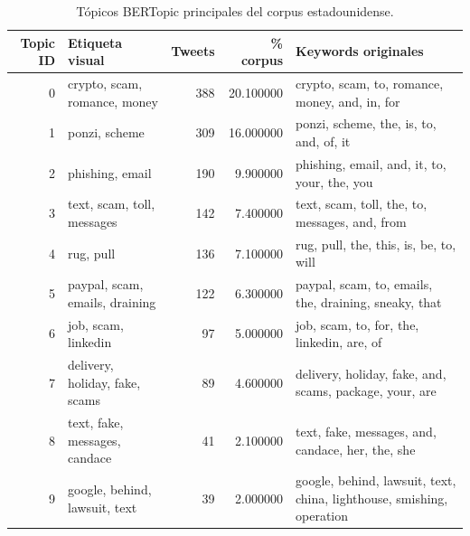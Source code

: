 \begin{table}
\caption{Tópicos BERTopic principales del corpus estadounidense.}
\label{tab:topicos_bertopic_eeuu}
\begin{tabular}{rlrrl}
\toprule
Topic ID & Etiqueta visual & Tweets & \% corpus & Keywords originales \\
\midrule
0 & crypto, scam, romance, money & 388 & 20.100000 & crypto, scam, to, romance, money, and, in, for \\
1 & ponzi, scheme & 309 & 16.000000 & ponzi, scheme, the, is, to, and, of, it \\
2 & phishing, email & 190 & 9.900000 & phishing, email, and, it, to, your, the, you \\
3 & text, scam, toll, messages & 142 & 7.400000 & text, scam, toll, the, to, messages, and, from \\
4 & rug, pull & 136 & 7.100000 & rug, pull, the, this, is, be, to, will \\
5 & paypal, scam, emails, draining & 122 & 6.300000 & paypal, scam, to, emails, the, draining, sneaky, that \\
6 & job, scam, linkedin & 97 & 5.000000 & job, scam, to, for, the, linkedin, are, of \\
7 & delivery, holiday, fake, scams & 89 & 4.600000 & delivery, holiday, fake, and, scams, package, your, are \\
8 & text, fake, messages, candace & 41 & 2.100000 & text, fake, messages, and, candace, her, the, she \\
9 & google, behind, lawsuit, text & 39 & 2.000000 & google, behind, lawsuit, text, china, lighthouse, smishing, operation \\
\bottomrule
\end{tabular}
\end{table}
